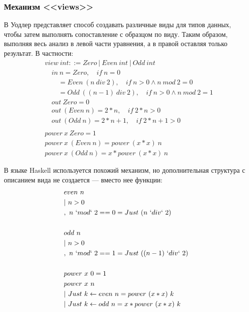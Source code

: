 \label{dependent-pattern-matching-extensions}

\subsubsection{Механизм <<views>>}\label{the-view-from-the-left}

В \cite{views} Уодлер представляет способ создавать различные виды для
типов данных, чтобы затем выполнять сопоставление с образцом по виду. Таким
образом, выполняя весь анализ в левой части уравнения, а в правой оставляя только
результат. В частности:
\begin{align*}
&view\ int ::= Zero\ |\ Even\ int\ |\ Odd\ int\\
&\quad in\ n = Zero,\quad if\ n = 0\\
&\qquad = Even\ (n\ div\ 2),\quad if\ n > 0 \land n\ mod\ 2 = 0\\
&\qquad = Odd\ ((n - 1)\ div\ 2),\quad if\ n > 0 \land n\ mod\ 2 = 1\\
&\quad out\ Zero = 0\\
&\quad out\ (Even\ n) = 2 * n,\quad if\ 2 * n > 0\\
&\quad out\ (Odd\ n) = 2 * n + 1,\quad if\ 2 * n + 1 > 0\\
\\
&power\ x\ Zero = 1\\
&power\ x\ (Even\ n) = power\ (x * x)\ n\\
&power\ x\ (Odd\ n) = x * power\ (x * x)\ n
\end{align*}

В языке Haskell используется похожий механизм, но дополнительная структура с
описанием вида не создается --- вместо нее функции:
\begin{align*}
&even\ n\\
&|\ n > 0\\
&,\ n\ `mod`\ 2 == 0 = Just\ (n\ `div`\ 2)\\
\\
&odd\ n\\
&|\ n > 0\\
&,\ n\ `mod`\ 2 == 1 = Just\ ((n - 1)\ `div`\ 2)\\
\\
&power\ x\ 0 = 1\\
&power\ x\ n\\
&|\ Just\ k \leftarrow even\ n = power\ (x * x)\ k\\
&|\ Just\ k \leftarrow odd\ n = x * power\ (x * x)\ k
\end{align*}

